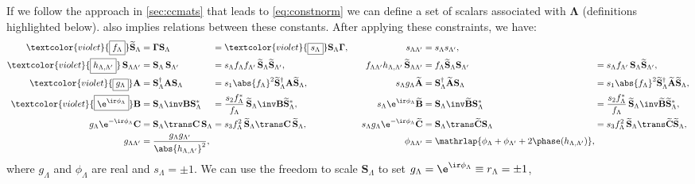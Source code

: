 \documentclass[11pt]{article}
\newcommand{\alert}[1]{\textcolor{violet}{\boxed{#1}}}
\newcommand{\cc}{^\ast}
\newcommand{\hc}{^\dag}
\newcommand{\Gammab}{\boldsymbol{\Gamma}}
\renewcommand{\S}{\mathbf{S}}
\newcommand{\A}{\mathbf{A}}
\newcommand{\B}{\mathbf{B}}
\renewcommand{\C}{\mathbf{C}}
\newcommand{\At}{\widetilde{\A}}
\newcommand{\Bt}{\widetilde{\B}}
\newcommand{\Ct}{\widetilde{\C}}
\newcommand{\St}{\widetilde{\S}}
\newcommand{\Lambdab}{\boldsymbol{\Lambda}}
\begin{document}
If we follow the approach in \cref{sec:ccmats} that leads to \cref{eq:constnorm} we can define a set of scalars associated with \(\Lambdab\) (definitions highlighted  \alert{\text{like this}} below).
 also implies relations between these constants.
After applying these constraints, we have:
%
\begin{equation*}
\begin{alignedat}{4}
  \alert{f_\Lambda} \St_\Lambda
    &= \Gammab \S_\Lambda 
    &&= \alert{s_\Lambda} \S_\Lambda \Gammab
    ,&
  s_{\Lambda\Lambda'} 
    &= s_{\Lambda} s_{\Lambda'}
    ,\\
  \alert{h_{\Lambda,\Lambda'}}\, \S_{\Lambda\Lambda'}
    &= \S_\Lambda \, \S_{\Lambda'}  
    &&= s_{\Lambda} f_\Lambda f_{\Lambda'}\, \St_\Lambda \St_{\Lambda'}
    ,&\qquad
  f_{\Lambda\Lambda'}h_{\Lambda,\Lambda'}\, \St_{\Lambda\Lambda'}
    &= f_{\Lambda} \St_\Lambda \S_{\Lambda'}  
    &&= s_{\Lambda} f_{\Lambda'}\, \S_\Lambda \St_{\Lambda'}
    ,\\ 
  \alert{g_\Lambda} \A
    &= \S_\Lambda\hc \A \S_\Lambda
    &&= s_1 \abs{f_\Lambda}^2 \St_\Lambda\hc \A \St_\Lambda
    ,&
  s_\Lambda g_\Lambda \At
    &= \S_\Lambda\hc \At \S_\Lambda 
    &&= s_1 \abs{f_\Lambda}^2 \St_\Lambda\hc \At \St_\Lambda
    ,\\
  \alert{\e^{\ir\phi_\Lambda}} \B
    &= \S_\Lambda\inv \B \S_\Lambda\cc 
    &&= \frac{s_2 f_\Lambda\cc}{f_\Lambda} \, \St_\Lambda\inv \B \St_\Lambda\cc
    ,&
  s_\Lambda \e^{\ir\phi_\Lambda} \Bt
    &= \S_\Lambda\inv \Bt \S_\Lambda\cc 
    &&= \frac{s_2 f_\Lambda\cc}{f_\Lambda} \, \St_\Lambda\inv \Bt \St_\Lambda\cc
    ,\\
  g_\Lambda \e^{-\ir\phi_\Lambda} \C
    &= \S_\Lambda\trans \C \, \S_\Lambda 
    &&= s_3 f_\Lambda^2\, \St_\Lambda\trans \C \, \St_\Lambda
    ,&
  s_\Lambda g_\Lambda \e^{-\ir\phi_\Lambda} \Ct
    &= \S_\Lambda\trans \Ct \S_\Lambda  
    &&= s_3 f_\Lambda^2\, \St_\Lambda\trans \Ct \St_\Lambda
    ,\\
  g_{\Lambda\Lambda'}  
    &= \frac{g_{\Lambda}g_{\Lambda'}}{\abs{h_{\Lambda,\Lambda'}}^2} 
    ,&&&
  \phi_{\Lambda\Lambda'} 
    &= \mathrlap{ \phi_\Lambda + \phi_{\Lambda'} + 2\phase(h_{\Lambda,\Lambda'}) }
    ,\\ 
\end{alignedat}
\end{equation*}
%
where \(g_\Lambda\) and \(\phi_\Lambda\) are real and \(s_\Lambda = \pm 1\).
We can use the freedom to scale \(\S_\Lambda\) to set \(g_\Lambda = \e^{\ir\phi_\Lambda} \equiv r_\Lambda = \pm 1\),
\end{document}

